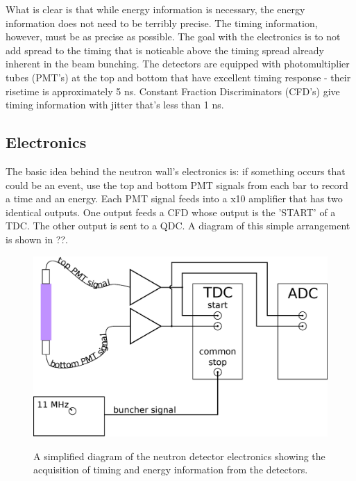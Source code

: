 What is clear is that while energy information is necessary, the energy information does not need to be terribly precise.  The timing information, however, must be as precise as possible.  The goal with the electronics is to not add spread to the timing that is noticable above the timing spread already inherent in the beam bunching.  The detectors are equipped with photomultiplier tubes (PMT's) at the top and bottom that have excellent timing response - their risetime is approximately 5 ns.  Constant Fraction Discriminators (CFD's) give timing information with jitter that's less than 1 ns.

\subsection{Electronics}
The basic idea behind the neutron wall's electronics is: if something occurs that could be an event, use the top and bottom PMT signals from each bar to record a time and an energy.  Each PMT signal feeds into a x10 amplifier that has two identical outputs.  One output feeds a CFD whose output is the 'START' of a TDC.  The other output is sent to a QDC.  A diagram of this simple arrangement is shown in \fig ??.

\begin{figure}[ht]
\centering
\includegraphics[width=1.0\textwidth]{figures/basic_electronics.eps}
\label{fig:simpleElectronics}
\caption{A simplified diagram of the neutron detector electronics showing the acquisition of timing and energy information from the detectors.}
\end{figure}


